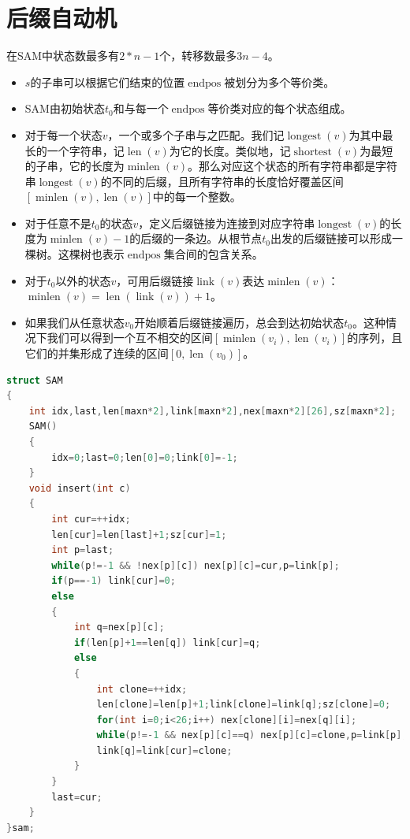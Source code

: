 \documentclass[a4paper]{book}
\begin{document}
\section{后缀自动机}
在SAM中状态数最多有$2*n-1$个，转移数最多$3n-4$。
\begin{itemize}
    \item $s$的子串可以根据它们结束的位置$\operatorname{endpos}$被划分为多个等价类。
    \item SAM由初始状态$t_0$和与每一个$\operatorname{endpos}$等价类对应的每个状态组成。
    \item 对于每一个状态$v$，一个或多个子串与之匹配。我们记$\operatorname{longest}(v)$为其中最长的一个字符串，记$\operatorname{len}(v)$为它的长度。类似地，记$\operatorname{shortest}(v)$为最短的子串，它的长度为$\operatorname{minlen}(v)$。那么对应这个状态的所有字符串都是字符串$\operatorname{longest}(v)$的不同的后缀，且所有字符串的长度恰好覆盖区间$[\operatorname{minlen}(v),\operatorname{len}(v)]$中的每一个整数。
    \item 对于任意不是$t_0$的状态$v$，定义后缀链接为连接到对应字符串$\operatorname{longest}(v)$的长度为$\operatorname{minlen}(v)-1$的后缀的一条边。从根节点$t_0$出发的后缀链接可以形成一棵树。这棵树也表示$\operatorname{endpos}$集合间的包含关系。
    \item 对于$t_0$以外的状态$v$，可用后缀链接$\operatorname{link}(v)$表达$\operatorname{minlen}(v)$：$\operatorname{minlen}(v)=\operatorname{len}(\operatorname{link}(v))+1$。
    \item 如果我们从任意状态$v_0$开始顺着后缀链接遍历，总会到达初始状态$t_0$。这种情况下我们可以得到一个互不相交的区间$[\operatorname{minlen}(v_i),\operatorname{len}(v_i)]$的序列，且它们的并集形成了连续的区间$[0,\operatorname{len}(v_0)]$。
\end{itemize}
\begin{lstlisting}[language=c++]
struct SAM
{
    int idx,last,len[maxn*2],link[maxn*2],nex[maxn*2][26],sz[maxn*2];
    SAM()
    {
        idx=0;last=0;len[0]=0;link[0]=-1;
    }
    void insert(int c)
    {
        int cur=++idx;
        len[cur]=len[last]+1;sz[cur]=1;
        int p=last;
        while(p!=-1 && !nex[p][c]) nex[p][c]=cur,p=link[p];
        if(p==-1) link[cur]=0;
        else
        {
            int q=nex[p][c];
            if(len[p]+1==len[q]) link[cur]=q;
            else
            {
                int clone=++idx;
                len[clone]=len[p]+1;link[clone]=link[q];sz[clone]=0;
                for(int i=0;i<26;i++) nex[clone][i]=nex[q][i];
                while(p!=-1 && nex[p][c]==q) nex[p][c]=clone,p=link[p];
                link[q]=link[cur]=clone;
            }
        }
        last=cur;
    }
}sam;
\end{lstlisting}
\end{document}
